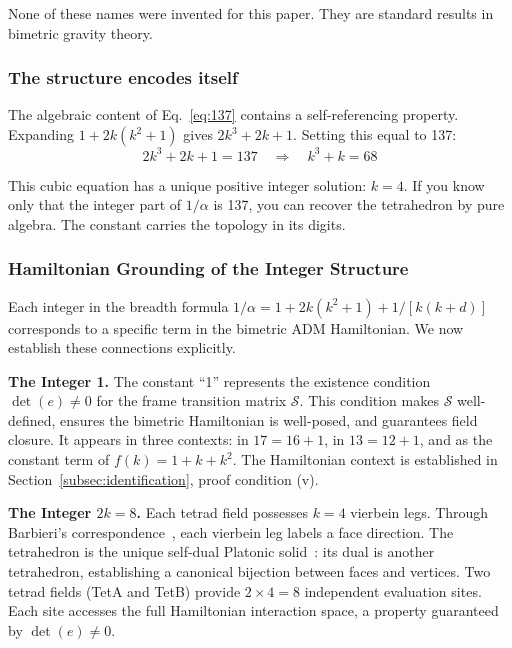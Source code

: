 \documentclass[aps,prd,preprint,superscriptaddress,showpacs,preprintnumbers,amsmath,amssymb,nofootinbib]{revtex4-2}
\begin{document}
None of these names were invented for this paper. They are standard results in bimetric gravity theory.

\subsubsection*{The structure encodes itself}

The algebraic content of Eq.~\eqref{eq:137} contains a self-referencing property. Expanding $1 + 2k(k^2 + 1)$ gives $2k^3 + 2k + 1$. Setting this equal to 137:
\begin{equation}
2k^3 + 2k + 1 = 137 \quad \Longrightarrow \quad k^3 + k = 68
\end{equation}

This cubic equation has a unique positive integer solution: $k = 4$. If you know only that the integer part of $1/\alpha$ is 137, you can recover the tetrahedron by pure algebra. The constant carries the topology in its digits.

\subsubsection*{Hamiltonian Grounding of the Integer Structure}

Each integer in the breadth formula $1/\alpha = 1 + 2k(k^2 + 1) + 1/[k(k+d)]$ corresponds to a specific term in the bimetric ADM Hamiltonian. We now establish these connections explicitly.

\textbf{The Integer 1.}
The constant ``1'' represents the existence condition $\det(e) \neq 0$ for the frame transition matrix $\mathcal{S}$. This condition makes $\mathcal{S}$ well-defined, ensures the bimetric Hamiltonian is well-posed, and guarantees field closure. It appears in three contexts: in $17 = 16 + 1$, in $13 = 12 + 1$, and as the constant term of $f(k) = 1 + k + k^2$. The Hamiltonian context is established in Section~\ref{subsec:identification}, proof condition (v).

\textbf{The Integer $2k = 8$.}
Each tetrad field possesses $k = 4$ vierbein legs. Through Barbieri's correspondence~\cite{barbieri1998}, each vierbein leg labels a face direction. The tetrahedron is the unique self-dual Platonic solid~\cite{coxeter1973}: its dual is another tetrahedron, establishing a canonical bijection between faces and vertices. Two tetrad fields (TetA and TetB) provide $2 \times 4 = 8$ independent evaluation sites. Each site accesses the full Hamiltonian interaction space, a property guaranteed by $\det(e) \neq 0$.
\end{document}
